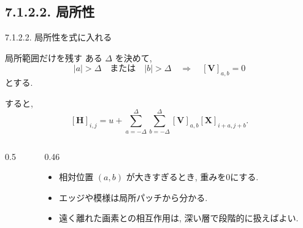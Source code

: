 \documentclass[dvipdfmx,uplatex,unicode,9pt,aspectratio=169]{beamer}
\newcommand{\X}{\mathbf{X}}
\newcommand{\Hid}{\mathbf{H}}
\newcommand{\V}{\mathbf{V}}
\begin{document}
\subsection{7.1.2.2. 局所性}
\begin{frame}{7.1.2.2. 局所性を式に入れる}
\begin{block}{局所範囲だけを残す}
ある $\Delta$ を決めて,
\[
  |a|>\Delta \quad \text{または}\quad |b|>\Delta
  \quad \Longrightarrow \quad
  [\V]_{a,b}=0
\]
とする.
\end{block}

すると,
\[
  [\Hid]_{i,j}
  =u+
  \sum_{a=-\Delta}^{\Delta}
  \sum_{b=-\Delta}^{\Delta}
  [\V]_{a,b}[\X]_{i+a,j+b}.
\]
\begin{columns}[T,totalwidth=\textwidth]
\begin{column}{0.5\textwidth}
\centering
{}
\end{column}
\begin{column}{0.46\textwidth}
\begin{itemize}
  \item 相対位置 $(a,b)$ が大きすぎるとき, 重みを0にする.
  \item エッジや模様は局所パッチから分かる.
  \item 遠く離れた画素との相互作用は, 深い層で段階的に扱えばよい.
\end{itemize}
\end{column}
\end{columns}
\end{frame}

\end{document}
